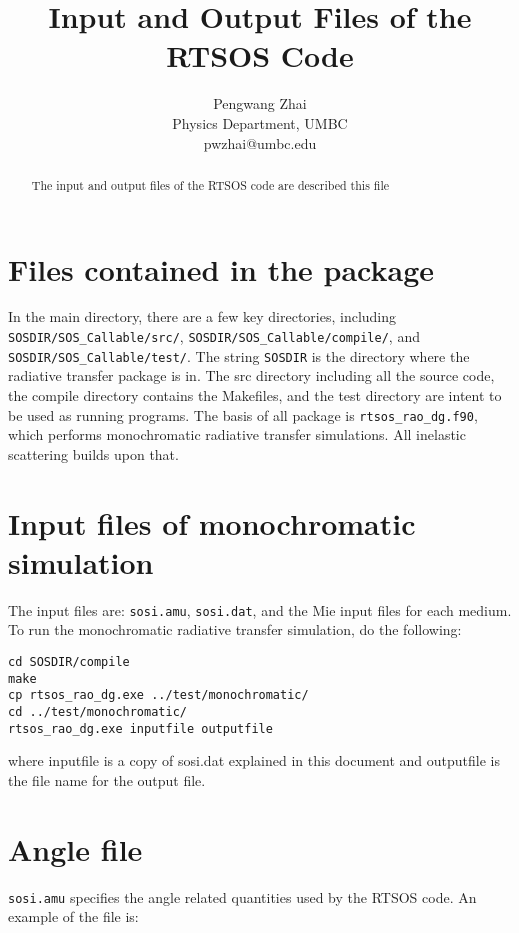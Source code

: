 \documentclass[10pt,letterpaper]{article}
\title{Input and Output Files of the RTSOS Code}
\author{Pengwang Zhai \\ Physics Department, UMBC \\ pwzhai@umbc.edu}
\begin{document}
\maketitle

\begin{abstract}
The input and output files of the RTSOS code are described this file
\end{abstract}


\section{Files contained in the package}
In the main directory, there are a few key directories, including \verb"SOSDIR/SOS_Callable/src/", \verb"SOSDIR/SOS_Callable/compile/", and \verb"SOSDIR/SOS_Callable/test/". The string \verb"SOSDIR" is the directory where the radiative transfer package is in. The src directory including all the source code, the compile directory contains the Makefiles, and the test directory are intent to be used as running programs. The basis of all package is \verb"rtsos_rao_dg.f90", which performs monochromatic radiative transfer simulations. All inelastic scattering builds upon that.

\section{Input files of monochromatic simulation}
The input files are: \verb"sosi.amu", \verb"sosi.dat",  and the Mie input files for each medium. To run the monochromatic radiative transfer simulation, do the following:

\begin{verbatim}
cd SOSDIR/compile
make
cp rtsos_rao_dg.exe ../test/monochromatic/
cd ../test/monochromatic/
rtsos_rao_dg.exe inputfile outputfile
\end{verbatim}

where inputfile is a copy of sosi.dat explained in this document and outputfile is the file name for the output file.

\section{Angle file}
\verb"sosi.amu" specifies the angle related quantities used by the RTSOS code.  An example of the file is:
\end{document}
